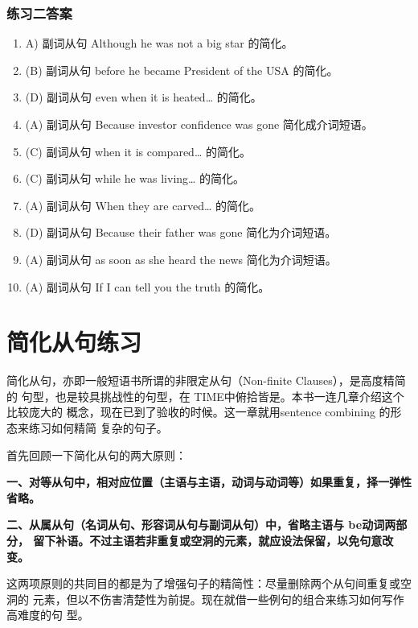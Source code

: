 \subsection{练习二答案}
\begin{enumerate}
\item A) 副词从句 Although he was not a big star 的简化。

\item(B) 副词从句 before he became President of the USA 的简化。

\item(D) 副词从句 even when it is heated… 的简化。

\item (A) 副词从句 Because investor confidence was gone 简化成介词短语。

\item (C) 副词从句 when it is compared… 的简化。

\item (C) 副词从句 while he was living… 的简化。

\item (A) 副词从句 When they are carved… 的简化。

\item (D) 副词从句 Because their father was gone 简化为介词短语。
\item (A) 副词从句 as soon as she heard the news 简化为介词短语。
\item (A) 副词从句 If I can tell you the truth 的简化。
\end{enumerate}

\chapter{简化从句练习}

简化从句，亦即一般短语书所谓的非限定从句（Non-finite Clauses），是高度精简的
句型，也是较具挑战性的句型，在 TIME中俯拾皆是。本书一连几章介绍这个比较庞大的
概念，现在已到了验收的时候。这一章就用sentence combining 的形态来练习如何精简
复杂的句子。

首先回顾一下简化从句的两大原则：

\textbf{一、对等从句中，相对应位置（主语与主语，动词与动词等）如果重复，择一弹性省略。}

\textbf{二、从属从句（名词从句、形容词从句与副词从句）中，省略主语与 be动词两部分，
  留下补语。不过主语若非重复或空洞的元素，就应设法保留，以免句意改变。}

这两项原则的共同目的都是为了增强句子的精简性：尽量删除两个从句间重复或空洞的
元素，但以不伤害清楚性为前提。现在就借一些例句的组合来练习如何写作高难度的句
型。

